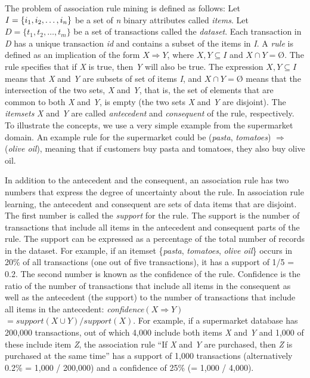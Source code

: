 The problem of association rule mining is defined as follows: Let $I = \{i{}_{1},\break i{}_{2}, \dots , i{}_{n}\}$ be a set of \textit{n} binary attributes called \textit{items}. Let $D = \{t{}_{1}, t{}_{2}, \dots , t{}_{m}\}$ be a set of transactions called the \textit{dataset}. Each transaction in \textit{D} has a unique transaction \textit{id} and contains a subset of the items in \textit{I}. A \textit{rule} is defined as an implication of the form $X \Rightarrow Y$, where $X, Y \subseteq I$ and $X \cap Y = \text{\O}$. The rule specifies that if \textit{X }is true, then \textit{Y} will also be true. The expression $X, Y \subseteq I$ means that \textit{X} and \textit{Y} are subsets of set of items \textit{I}, and $X \cap Y = \text{\O}$ means that the intersection of the two sets, \textit{X }and \textit{Y}, that is, the set of elements that are common to both \textit{X }and \textit{Y}, is empty (the two sets \textit{X} and \textit{Y} are disjoint). The \textit{itemsets} \textit{X} and \textit{Y} are called \textit{antecedent} and \textit{consequent} of the rule, respectively. To illustrate the concepts, we use a very simple example from the supermarket domain. An example rule for the supermarket could be (\textit{pasta}, \textit{tomatoes}) $\Rightarrow$ (\textit{olive oil}), meaning that if customers buy pasta and tomatoes, they also buy olive oil.

In addition to the antecedent and the consequent, an association rule has two numbers that express the degree of uncertainty about the rule. In association rule learning, the antecedent and consequent are sets of data items that are disjoint. The first number is called the \textit{support} for the rule. The support is the number of transactions that include all items in the antecedent and consequent parts of the rule. The support can be expressed as a percentage of the total number of records in the dataset. For example, if an itemset \{\textit{pasta}, \textit{tomatoes}, \textit{olive oil}\} occurs in 20\% of all transactions (one out of five transactions), it has a support of 1/5 = 0.2. The second number is known as the confidence of the rule. Confidence is the ratio of the number of transactions that include all items in the consequent as well as the antecedent (the support) to the number of transactions that include all items in the antecedent: \textit{confidence}$(X \Rightarrow Y)$ $= support(X \cup Y)/support(X)$. For example, if a supermarket database has 200,000 transactions, out of which 4,000 include both items \textit{X} and \textit{Y} and 1,000 of these include item \textit{Z}, the association rule ``If \textit{X} and \textit{Y} are purchased, then \textit{Z} is purchased at the same time'' has a support of 1,000 transactions (alternatively 0.2\% = 1,000 / 200,000) and a confidence of 25\% (= 1,000 / 4,000).


